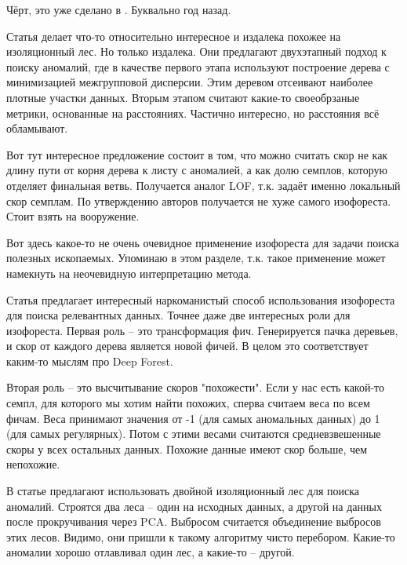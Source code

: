 \documentclass[12pt]{article}
\begin{document}
Чёрт, это уже сделано в
\cite{lesoupleGeneralizedIsolationForest2021}
. Буквально год назад.

Статья
\cite{yuFilteringRefinementTwoStage2009}
делает что-то относительно интересное и издалека похожее на изоляционный лес. Но только
издалека. Они предлагают двухэтапный подход к поиску аномалий, где в качестве первого этапа
используют построение дерева с минимизацией межгрупповой дисперсии. Этим деревом отсеивают
наиболее плотные участки данных. Вторым этапом считают какие-то своеобрзаные метрики,
основанные на расстояниях. Частично интересно, но расстояния всё обламывают.

Вот тут
\cite{aryalImprovingIForestRelative2014}
интересное предложение
состоит в том, что можно считать скор не как длину пути от корня дерева к листу с аномалией,
а как долю семплов, которую отделяет финальная ветвь. Получается аналог LOF, т.к. задаёт
именно локальный скор семплам. По утверждению авторов получается не хуже самого изофореста.
Стоит взять на вооружение.

Вот здесь
\cite{chenIsolationForestAlternative2019}
какое-то не очень очевидное применение изофореста для задачи поиска полезных ископаемых.
Упоминаю в этом разделе, т.к. такое применение может намекнуть на неочевидную интерпретацию
метода.

Статья
\cite{zhouRelevanceFeatureMapping2012}
предлагает интересный наркоманистый способ использования изофореста для поиска релевантных
данных. Точнее даже две интересных роли для изофореста. Первая роль -- это трансформация
фич. Генерируется пачка деревьев, и скор от каждого дерева является новой фичей. В целом
это соответствует каким-то мыслям про Deep Forest.

Вторая роль -- это высчитывание скоров "похожести". Если у нас есть какой-то семпл, для которого
мы хотим найти похожих, сперва считаем веса по всем фичам. Веса принимают значения от -1 (для самых аномальных данных) до 1 (для самых регулярных).
Потом с этими весами считаются средневзвешенные скоры у всех остальных данных. Похожие данные
имеют скор больше, чем непохожие.

В статье
\cite{elnourDualIsolationForestsBasedAttackDetection2020}
предлагают использовать двойной изоляционный лес для поиска аномалий. Строятся два леса --
один на исходных данных, а другой на данных после прокручивания через PCA. Выбросом
считается объединение выбросов этих лесов. Видимо, они пришли к такому алгоритму чисто
перебором. Какие-то аномалии хорошо отлавливал один лес, а какие-то -- другой.
\end{document}
